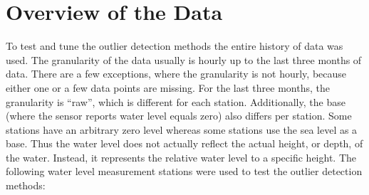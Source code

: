 \section{Overview of the Data}
To test and tune the outlier detection methods the entire history of data was used. The granularity of the data usually is hourly up to the last three months of data. There are a few exceptions, where the granularity is not hourly, because either one or a few data points are missing. For the last three months, the granularity is ``raw'', which is different for each station. Additionally, the base (where the sensor reports water level equals zero) also differs per station. Some stations have an arbitrary zero level whereas some stations use the sea level as a base. Thus the water level does not actually reflect the actual height, or depth, of the water. Instead, it represents the relative water level to a specific height.
\newline
The following water level measurement stations were used to test the outlier detection methods:
